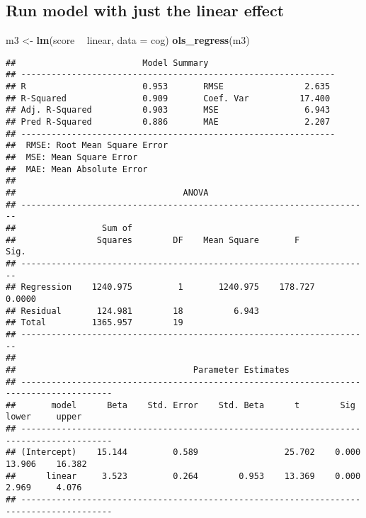 \documentclass[]{article}
\newenvironment{Shaded}{\begin{snugshade}}{\end{snugshade}}
\newcommand{\KeywordTok}[1]{\textcolor[rgb]{0.13,0.29,0.53}{\textbf{#1}}}
\newcommand{\DataTypeTok}[1]{\textcolor[rgb]{0.13,0.29,0.53}{#1}}
\newcommand{\StringTok}[1]{\textcolor[rgb]{0.31,0.60,0.02}{#1}}
\newcommand{\OperatorTok}[1]{\textcolor[rgb]{0.81,0.36,0.00}{\textbf{#1}}}
\newcommand{\NormalTok}[1]{#1}
\begin{document}
\subsection{Run model with just the linear
effect}\label{run-model-with-just-the-linear-effect}

\begin{Shaded}
\begin{Highlighting}[]
\NormalTok{m3 <-}\StringTok{ }\KeywordTok{lm}\NormalTok{(score }\OperatorTok{~}\StringTok{ }\NormalTok{linear, }\DataTypeTok{data =}\NormalTok{ cog)}
\KeywordTok{ols_regress}\NormalTok{(m3)}
\end{Highlighting}
\end{Shaded}

\begin{verbatim}
##                         Model Summary                          
## --------------------------------------------------------------
## R                       0.953       RMSE                2.635 
## R-Squared               0.909       Coef. Var          17.400 
## Adj. R-Squared          0.903       MSE                 6.943 
## Pred R-Squared          0.886       MAE                 2.207 
## --------------------------------------------------------------
##  RMSE: Root Mean Square Error 
##  MSE: Mean Square Error 
##  MAE: Mean Absolute Error 
## 
##                                 ANOVA                                 
## ---------------------------------------------------------------------
##                 Sum of                                               
##                Squares        DF    Mean Square       F         Sig. 
## ---------------------------------------------------------------------
## Regression    1240.975         1       1240.975    178.727    0.0000 
## Residual       124.981        18          6.943                      
## Total         1365.957        19                                     
## ---------------------------------------------------------------------
## 
##                                   Parameter Estimates                                    
## ----------------------------------------------------------------------------------------
##       model      Beta    Std. Error    Std. Beta      t        Sig      lower     upper 
## ----------------------------------------------------------------------------------------
## (Intercept)    15.144         0.589                 25.702    0.000    13.906    16.382 
##      linear     3.523         0.264        0.953    13.369    0.000     2.969     4.076 
## ----------------------------------------------------------------------------------------
\end{verbatim}
\end{document}
